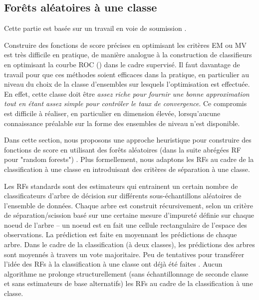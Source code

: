 \subsection{Forêts aléatoires à une classe}
\label{resume_fr:ocrf}
Cette partie est basée sur un travail en voie de soumission \citep{OCRF16}.


Construire des fonctions de score précises en optimisant les critères EM ou MV est très difficile en pratique, de manière analogue à la construction de classifieurs en optimisant la courbe ROC (\cite{Clemencon2010}) dans le cadre supervisé.
%
Il faut davantage de travail pour que ces méthodes soient efficaces dans la pratique, en particulier au niveau du  choix de la classe d'ensembles sur lesquels l'optimisation est effectuée.
En effet, cette classe doit être \emph{assez riche pour fournir une bonne approximation tout en étant assez simple pour contrôler le taux de convergence}. Ce compromis est difficile à réaliser, en particulier en dimension élevée, lorsqu'aucune connaissance préalable sur la forme des ensembles de niveau n'est disponible.

Dans cette section, nous proposons une approche heuristique pour construire des fonctions de score en utilisant des forêts aléatoires (dans la suite abrégées RF pour "random forests") \citep{Breiman2001, Genuer2008, Biau2008, Biau2016}.
Plus formellement, nous adaptons les RFs au cadre de la classification à une classe en introduisant des critères de séparation à une classe.

Les RFs standards sont des estimateurs qui entrainent un certain nombre de classificateurs d'arbre de décision sur différents sous-échantillons aléatoires de l'ensemble de données. Chaque arbre est construit récursivement, selon un critère de séparation/scission basé sur une certaine mesure d'impureté définie sur chaque noeud de l'arbre -- un noeud est en fait une cellule rectangulaire de l'espace des observations. La prédiction est faite en moyennant les prédictions de chaque arbre. Dans le cadre de la classification (à deux classes), les prédictions des arbres sont moyennés à travers un vote majoritaire. Peu de tentatives pour transférer l'idée des RFs à la classification à une classe ont déjà été faites \citep{Desir12, Liu2008, Shi2012}. Aucun algorithme ne prolonge structurellement (sans échantillonnage de seconde classe et sans estimateurs de base alternatifs) les RFs au cadre de la classification à une classe.

